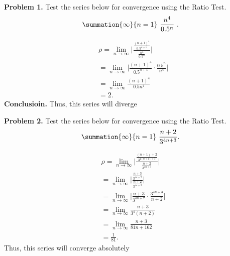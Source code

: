 \documentclass{report}
\begin{document}
    \bigbreak \noindent 
    \begin{mdframed}
        \textbf{Problem 1.} 
Test the series below for convergence using the Ratio Test.
        \begin{align*}
            \summation{\infty}{n=1}\ \frac{n^{4}}{0.5^{n}}\ 
        .\end{align*}
    \end{mdframed}
    \bigbreak \noindent 
    \begin{align*}
        &\rho = \lim\limits_{n \to \infty}{\bigg\lvert \frac{\frac{(n+1)^{4}}{0.5^{n+1}}}{\frac{n^{4}}{0.5^{n}}} \bigg\rvert}  \\
        &=\lim\limits_{n \to \infty}{\bigg\lvert \frac{(n+1)^{4}}{0.5^{n+1}}  \cdot  \frac{0.5^{n}}{n^{4}}\bigg\rvert} \\
        &=\lim\limits_{n \to \infty}{\frac{(n+1)^{4}}{0.5n^{4}}} \\
        &=2
    .\end{align*}
    \bigbreak \noindent 
    \textbf{Conclusioin. }Thus, this series will diverge

    \bigbreak \noindent 
    \begin{mdframed}
        \textbf{Problem 2.} Test the series below for convergence using the Ratio Test.
    \begin{align*}
        \summation{\infty}{n=1}\ \frac{n+2}{3^{4n+3}}     
    .\end{align*}
    \end{mdframed}
    \bigbreak \noindent 
    \begin{align*}
        &\rho = \lim\limits_{n \to \infty}{\bigg\lvert \frac{\frac{(n+1)+2}{3^{4(n+1)+3}}}{\frac{n+2}{3^{4n+3}}} \bigg\rvert} \\
        &=\lim\limits_{n \to \infty}{\bigg\lvert \frac{\frac{n+3}{3^{4n+7}}}{\frac{n+2}{3^{4n+3}}} \bigg\rvert} \\
        &=\lim\limits_{n \to \infty}{\bigg\lvert \frac{n+3}{3^{4n+7}} \cdot \frac{3^{4n+3}}{n+2} \bigg\rvert} \\
        &=\lim\limits_{n \to \infty}{\frac{n+3}{3^{4}(n+2)}} \\
        &=\lim\limits_{n \to \infty}{\frac{n+3}{81n+162}} \\
        &=\frac{1}{81}
    .\end{align*}
    \bigbreak \noindent 
    Thus, this series will converge absolutely
\end{document}
